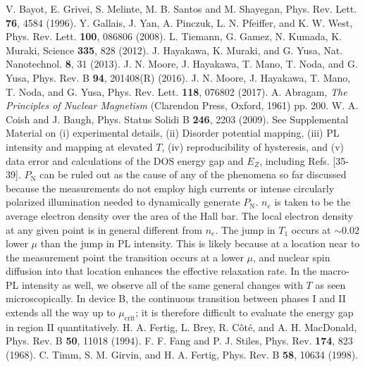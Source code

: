 \documentclass
[aps,prl,twocolumn,superscriptaddress,showpacs,floatfix]{revtex4-1}%
\begin{document}
\begin{thebibliography}{99}
V. Bayot, E. Grivei, S. Melinte, M. B. Santos and M. Shayegan, Phys. Rev. Lett. \textbf{76}, 4584 (1996).
Y. Gallais, J. Yan, A. Pinczuk, L. N. Pfeiffer, and K. W. West, Phys. Rev. Lett. \textbf{100}, 086806 (2008).
L. Tiemann, G. Gamez, N. Kumada, K. Muraki, Science \textbf{335}, 828 (2012).
J. Hayakawa, K. Muraki, and G. Yusa, Nat. Nanotechnol. \textbf{8}, 31 (2013).
J. N. Moore, J. Hayakawa, T. Mano, T. Noda, and G. Yusa, Phys. Rev. B \textbf{94}, 201408(R) (2016).
J. N. Moore, J. Hayakawa, T. Mano, T. Noda, and G. Yusa, Phys. Rev. Lett. \textbf{118}, 076802 (2017). 
A. Abragam, \textit{The Principles of Nuclear Magnetism} (Clarendon Press, Oxford, 1961) pp. 200.
W. A. Coish and J. Baugh, Phys. Status Solidi B \textbf{246}, 2203 (2009).
See Supplemental Material on (i) experimental details, (ii) Disorder potential mapping, (iii) PL intensity and mapping at elevated $T$, (iv) reproducibility of hysteresis, and (v) data error and calculations of the DOS energy gap and $E_Z$, including Refs. [35-39]. 
$P_\text{N}$ can be ruled out as the cause of any of the phenomena so far discussed because the measurements do not employ high currents or intense circularly polarized illumination needed to dynamically generate $P_\text{N}$.
$n_e$ is taken to be the average electron density over the area of the Hall bar. The local electron density at any given point is in general different from $n_e$.
The jump in $T_{1}$ occurs at ${\sim}0.02$ lower $\mu$ than the jump in PL intensity. This is likely because at a location near to the measurement point the transition occurs at a lower $\mu$, and nuclear spin diffusion into that location enhances the effective relaxation rate.
In the macro-PL intensity as well, we observe all of the same general changes with $T$ as seen microscopically.
In device B, the continuous transition between phases I and II extends all the way up to $\mu_{\text{crit}}$; it is therefore difficult to evaluate the energy gap in region II quantitatively.
H. A. Fertig, L. Brey, R. Côté, and A. H. MacDonald, Phys. Rev. B \textbf{50}, 11018 (1994).
F. F. Fang and P. J. Stiles, Phys. Rev. \textbf{174}, 823 (1968).
C. Timm, S. M. Girvin, and H. A. Fertig, Phys. Rev. B \textbf{58}, 10634 (1998).


\end{thebibliography}
\end{document}
